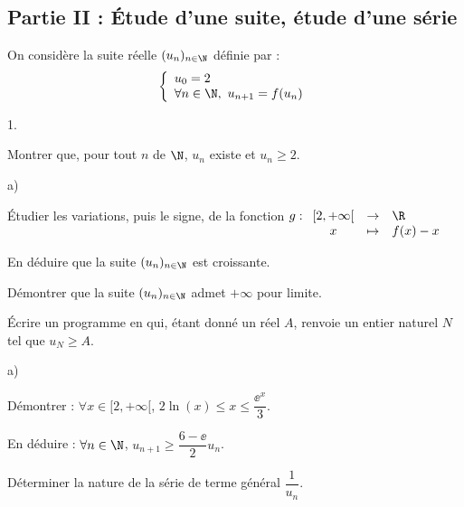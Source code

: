 \subsection*{Partie II : Étude d'une suite, étude d'une série}
\noindent
On considère la suite réelle $(u_n)_{n\in\N}$ définie par :
\[
\left\{
  \begin{array}{l}
    u_0=2\\
    \forall n \in\N, \ u_{n+1}=f(u_n)
  \end{array}
\right.
\]
\begin{noliste}{1.}
  \setlength{\itemsep}{2mm}
  \setcounter{enumi}{4}
\item Montrer que, pour tout $n$ de $\N$, $u_n$ existe et $u_n\geq 2$.
  
  
  
\item 
  \begin{noliste}{a)}
  \item Étudier les variations, puis le signe, de la fonction $g:
    \begin{array}[t]{ccl}
      [2,+\infty[ & \rightarrow & \R\\
      x& \mapsto & f(x)-x
    \end{array}$
    
    
    
  \item En déduire que la suite $(u_n)_{n\in\N}$ est croissante.
	
    
  \end{noliste}
  
  
\item Démontrer que la suite $(u_n)_{n\in\N}$ admet $+\infty$ pour 
  limite.
  
  

\item Écrire un programme en \Scilab{} qui, étant donné un réel $A$,
  renvoie un entier naturel $N$ tel que $u_N\geq A$.




\item 
  \begin{noliste}{a)}
  \item Démontrer : $\forall x\in[2,+\infty[$, $2\ln(x)\leq x \leq
    \dfrac{\ee^x}{3}$.
    
    
    
  \item En déduire : $\forall n\in\N$, $u_{n+1} \geq
    \dfrac{6-\ee}{2}u_n$.
	
    
    

	

  \item Déterminer la nature de la série de terme général
    $\dfrac{1}{u_n}$.
	
    
\end{noliste}
\end{noliste}


